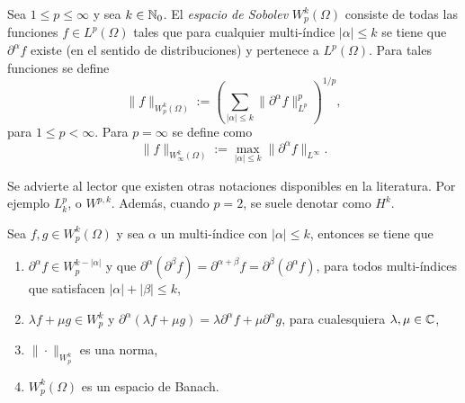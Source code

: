 \begin{definition}
	Sea $1\leq p \leq\infty$ y sea $k\in\mathbb{N}_0$. El \textit{espacio de Sobolev} $W^k_p(\Omega)$ consiste de todas las funciones $f\in L^p(\Omega)$ tales que para cualquier multi-índice $|\alpha|\leq k$ se tiene que $\partial^\alpha f$ existe (en el sentido de distribuciones) y pertenece a $L^p(\Omega)$. Para tales funciones se define 
	\begin{equation*}
		\|f\|_{W^k_p(\Omega)} := \left( \sum_{|\alpha|\leq k} \|\partial^\alpha f\|_{L^p}^p
		\right)^{1/p},
	\end{equation*}
	para $1\leq p <\infty$. Para $p=\infty$ se define como 
	\begin{equation*}
		\|f\|_{W^k_\infty(\Omega)} := \max_{|\alpha|\leq k} \|\partial^\alpha f\|_{L^\infty}.
	\end{equation*}
\end{definition}
\begin{remark}
	Se advierte al lector que existen otras notaciones disponibles en la literatura.  Por ejemplo $L^p_k$, o $W^{p,k}$. Además, cuando $p=2$, se suele denotar como $H^k$.
\end{remark}
\begin{theorem} \label{theo:Sobolev-Banach}
	Sea $f, g \in W^k_p(\Omega)$ y sea $\alpha$ un multi-índice con $|\alpha|\leq k$, entonces se tiene que 
	\begin{enumerate}
		\item $\partial^\alpha f \in W^{k-|\alpha|}_p$ y que $\partial^{\alpha}(\partial^{\beta}f) = \partial^{\alpha+\beta} f = \partial^{\beta}(\partial^{\alpha}f)$, para todos multi-índices que satisfacen  $|\alpha|+|\beta| \leq k$,
		\item $\lambda f + \mu g \in W^k_p$ y $\partial^\alpha(\lambda f + \mu g) = \lambda\partial^\alpha f + \mu\partial^\alpha g$, para cualesquiera $\lambda, \mu\in \mathbb{C}$,
		\item $\|\cdot\|_{W^k_p}$ es una norma,
		\item $W^k_p(\Omega)$ es un espacio de Banach.
	\end{enumerate}  
\end{theorem}

